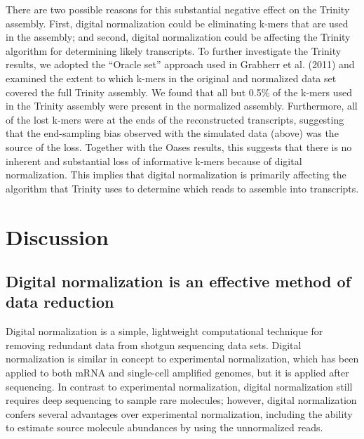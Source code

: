 \documentclass[10pt,draft]{article}
\begin{document}
There are two possible reasons for this substantial negative effect on
the Trinity assembly.  First, digital normalization could be
eliminating k-mers that are used in the assembly; and second, digital
normalization could be affecting the Trinity algorithm for determining
likely transcripts.  To further investigate the Trinity results, we
adopted the ``Oracle set'' approach used in Grabherr et al. (2011) and
examined the extent to which k-mers in the original and normalized
data set covered the full Trinity assembly.  We found that all but
0.5\% of the k-mers used in the Trinity assembly were present in the
normalized assembly.  Furthermore, all of the lost k-mers were at the
ends of the reconstructed transcripts, suggesting that the
end-sampling bias observed with the simulated data (above) was the
source of the loss.  Together with the Oases results, this suggests
that there is no inherent and substantial loss of informative k-mers
because of digital normalization.  This implies that digital
normalization is primarily affecting the algorithm that Trinity uses
to determine which reads to assemble into transcripts.


\section*{Discussion}


\subsection*{Digital normalization is an effective method of data reduction}

Digital normalization is a simple, lightweight computational technique
for removing redundant data from shotgun sequencing data sets.
Digital normalization is similar in concept to experimental
normalization, which has been applied to both mRNA and single-cell
amplified genomes, but it is applied after sequencing.  In contrast to
experimental normalization, digital normalization still requires deep
sequencing to sample rare molecules; however, digital normalization
confers several advantages over experimental normalization, including
the ability to estimate source molecule abundances by using the
unnormalized reads.
\end{document}
